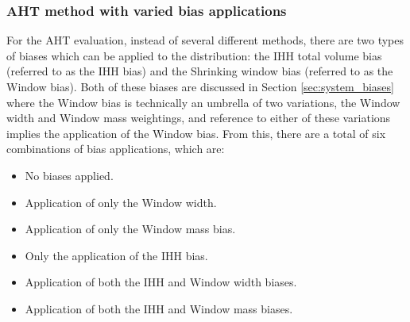 \FloatBarrier
\subsubsection{AHT method with varied bias applications}\label{sec:lyso_aht}
For the AHT evaluation, instead of several different methods, there are two types of biases which can be applied to the distribution: the IHH total volume bias (referred to as the IHH bias) and the Shrinking window bias (referred to as the Window bias). Both of these biases are discussed in Section \ref{sec:system_biases} where the Window bias is technically an umbrella of two variations, the Window width and Window mass weightings, and reference to either of these variations implies the application of the Window bias. From this, there are a total of six combinations of bias applications, which are:
\begin{multicols}{2}
	\begin{itemize}
		\item No biases applied.
		\item Application of only the Window width.
		\item Application of only the Window mass bias.
		\columnbreak
		\item Only the application of the IHH bias.
		\item Application of both the IHH and Window width biases.
		\item Application of both the IHH and Window mass biases.
	\end{itemize}
\end{multicols}


